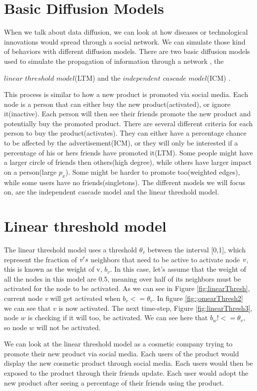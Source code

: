 \section{Basic Diffusion Models}
When we talk about data diffusion, we can look at how diseases or technological innovations would spread through a social network. We can simulate those kind of behaviors with different diffusion models. There are two basic diffusion models used to simulate the propagation of information through a network \cite{MaximizeSpread2003}, the {$linear$ $threshold$ $model$(LTM) and the $ independent$ $cascade$ $model$(ICM) \cite{MaximizeSpread2003}.

This process is similar to how a new product is promoted via social media. Each node is a person that can either buy the new product(activated), or ignore it(inactive). Each person will then see their friends promote the new product and potentially buy the promoted product. There are several different criteria for each person to buy the product(activates). They can either have a percentage chance to be affected by the advertisement(ICM), or they will only be interested if a percentage of his or hers friends have promoted it(LTM). Some people might have a larger circle of friends then others(high degree), while others have larger impact on a person(large $p_x$). Some might be harder to promote too(weighted edges), while some users have no friends(singletons). The different models we will focus on, are the independent cascade model and the linear threshold model.

\section{Linear threshold model}
The linear threshold model uses a threshold $\theta_v$ between the interval [0,1], which represent the fraction of $\it{v}'s$ neighbors that need to be active to activate node $\it{v}$, this is known as the weight of v, $b_v$. In this case, let's assume that the weight of all the nodes in this model are 0.5, meaning over half of its neighbors must be activated for the node to be activated. As we can see in Figure \ref{fig:linearThresh}, current node {\it v} will get activated when $b_v <= \theta_v$. In figure \ref{fig:;omearThresh2} we can see that $v$ is now activated. The next time-step, Figure \ref{fig:linearThresh3}, node $w$ is checking if it will too, be activated. We can see here that $b_w !<= \theta_v$, so node $w$ will not be activated.  

We can look at the linear threshold model as a cosmetic company trying to promote their new product via social media. Each users of the product would display the new cosmetic product through social media. Each users would then be exposed to the product through their friends update. Each user would adopt the new product after seeing a percentage of their friends using the product. 

}
